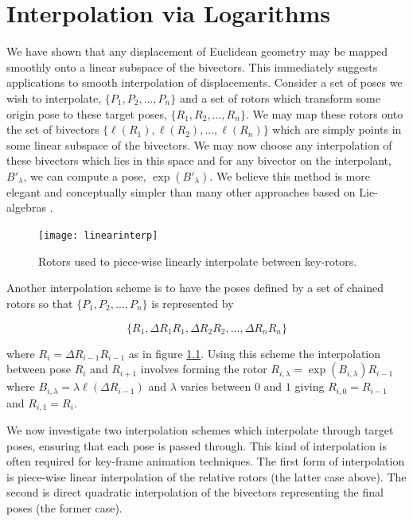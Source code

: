 \chapter{Interpolation via Logarithms}

We have shown that any displacement of Euclidean geometry
may be mapped smoothly
onto a linear subspace of the bivectors. This immediately suggests applications to smooth interpolation
of displacements. Consider a set of poses we wish to interpolate, $\{P_1, P_2, ..., P_n\}$ and a set
of rotors which transform some origin pose to these target poses, $\{R_1, R_2, ..., R_n\}$. We
may map these rotors onto the set of bivectors $\{\ell(R_1), \ell(R_2), ..., \ell(R_n)\}$ which
are simply points in some linear subspace of the bivectors. We may now choose any interpolation of these bivectors
which lies in this space and for any bivector on the interpolant, $B'_\lambda$, we can compute
a pose, $\exp(B'_\lambda)$. We believe this method is more elegant and conceptually simpler
than many other approaches based on Lie-algebras \cite{LIE:Consistentmotion, LIE:Moak,
  LIE:ROT, LIE:Sphericalfun}.

\begin{figure}[t]\centering
\texttt{[image: linearinterp]}
\caption{\label{fig:linearinterp}Rotors used to piece-wise linearly interpolate between key-rotors.}
\end{figure}

Another interpolation scheme is to have the poses defined by a set of chained rotors so that
$\{P_1, P_2, ..., P_n\}$ is represented by 

\[\{R_1, \Delta R_1R_1, \Delta R_2 R_2, ..., \Delta R_n R_n\}\]

where $R_i = \Delta R_{i-1} R_{i-1}$ as in figure \ref{fig:linearinterp}. Using
this scheme the interpolation between pose $R_i$ and $R_{i+1}$ involves forming
the rotor $R_{i,\lambda} = \exp(B_{i,\lambda})R_{i-1}$ where $B_{i,\lambda} =
\lambda \ell(\Delta R_{i-1})$ and $\lambda$ varies between $0$ and $1$ giving
$R_{i,0} = R_{i-1}$ and $R_{i,1} = R_i$.

We now investigate two interpolation schemes which interpolate through target
poses, ensuring that each pose is passed through. This kind of interpolation is
often required for key-frame animation techniques. The first form of
interpolation is piece-wise linear interpolation of the relative rotors (the
		latter case above). The second is direct quadratic
interpolation of the bivectors representing the final poses (the former case).

